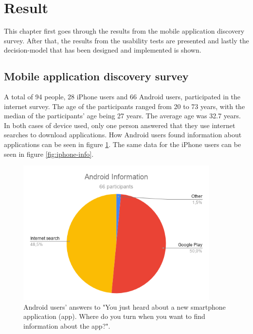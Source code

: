 \section{ Result }
This chapter first goes through the results from the mobile application discovery survey. After that, the results from the usability tests are presented and lastly the decision-model that has been designed and implemented is shown. 

\subsection{Mobile application discovery survey}

A total of 94 people, 28 iPhone users and 66 Android users, participated in the internet survey. The age of the participants ranged from 20 to 73 years, with the median of the participants' age being 27 years. The average age was 32.7 years.  
In both cases of device used, only one person answered that they use internet searches to download applications. How Android users found information about applications can be seen in figure \ref{fig:android-info}. The same data for the iPhone users can be seen in figure \ref{fig:iphone-info}.

\begin{figure}[ht]
    \centering 
    \includegraphics[width=0.9\textwidth]{img/Android_Information.png}
    \hfill
    \caption{\label{fig:android-info}{Android users' answers to "You just heard about a new smartphone application (app). Where do you turn when you want to find information about the app?".}}
\end{figure}

